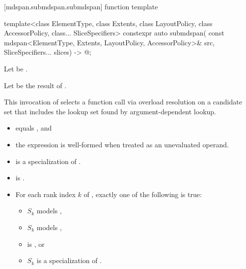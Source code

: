 [mdspan.submdspan.submdspan]{ function template}

%
\begin{itemdecl}
template<class ElementType, class Extents, class LayoutPolicy,
         class AccessorPolicy, class... SliceSpecifiers>
  constexpr auto submdspan(
    const mdspan<ElementType, Extents, LayoutPolicy, AccessorPolicy>& src,
    SliceSpecifiers... slices) -> @\seebelow@;
\end{itemdecl}

\begin{itemdescr}
\pnum
Let  be .

\pnum
Let  be the result of
.
\begin{note}
This invocation of 
selects a function call via overload resolution
on a candidate set that includes the lookup set
found by argument-dependent lookup.
\end{note}

\pnum
\constraints
\begin{itemize}
\item
{} equals , and
\item
the expression 
is well-formed when treated as an unevaluated operand.
\end{itemize}

\pnum
\mandates
\begin{itemize}
\item
{}
is a specialization of .

\item
{}
is .

\item
For each rank index $k$ of ,
exactly one of the following is true:
  \begin{itemize}
  \item $S_k$ models ,
  \item $S_k$ models ,
  \item {} is , or
  \item $S_k$ is a specialization of .
  \end{itemize}
\end{itemize}


\end{itemdescr}
